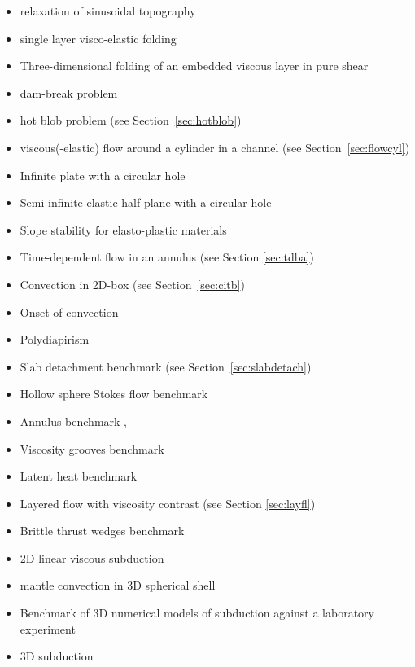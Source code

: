 \begin{itemize}
\item relaxation of sinusoidal topography \cite{crsg12,robh17}
\item single layer visco-elastic folding \cite{scps01,vosc15}
\item Three-dimensional folding of an embedded viscous layer in pure shear \cite{flet91}
\item dam-break problem \cite{moeb99,bacp07,liir07,lemx08,homa09,anco09,grdn97,hini81,basd08}
\item hot blob problem \cite{bugs09,fumt11} (see Section~\ref{sec:hotblob})
\item viscous(-elastic) flow around a cylinder in a channel (see Section~\ref{sec:flowcyl})
\item Infinite plate with a circular hole \cite{yiha10,rama16}
\item Semi-infinite elastic half plane with a circular hole \cite{verr98}
\item Slope stability for elasto-plastic materials \cite{rama16}
\item Time-dependent flow in an annulus \cite{galb19} (see Section \ref{sec:tdba})
\item Convection in 2D-box \cite{galb19} (see Section~\ref{sec:citb})
\item Onset of convection \cite{aspectmanual}
\item Polydiapirism \cite{wesc92,aspectmanual}
\item Slab detachment benchmark (see Section~\ref{sec:slabdetach}) 
\item Hollow sphere Stokes flow benchmark \cite{thie17,homb20}
\item Annulus benchmark \cite{aspectmanual}, \cite{ples11}
\item Viscosity grooves benchmark \cite{aspectmanual}
\item Latent heat benchmark \cite{aspectmanual}
\item Layered flow with viscosity contrast \cite{aspectmanual} (see Section \ref{sec:layfl}) 
\item Brittle thrust wedges benchmark \cite{busa16,aspectmanual}
\item 2D linear viscous subduction \cite{scbe08,gltf18}
\item mantle convection in 3D spherical shell \cite{rasz96,iwas96,zhzm00,yoka04,sthh06,chcc07,zhmt08,kaks08,wrfy10,dadb13,arfw14,liki19}
\item Benchmark of 3D numerical models of subduction against a laboratory experiment \cite{memm18}
\item 3D subduction \cite{ozrs08}

\end{itemize}
